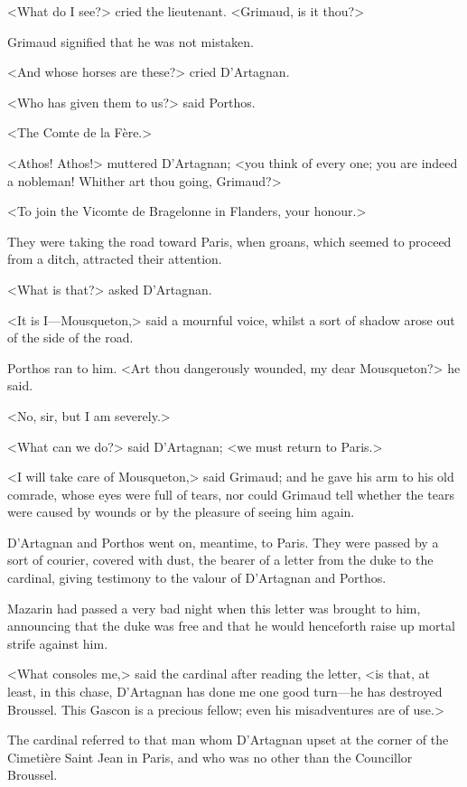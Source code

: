 <What do I see?> cried the lieutenant. <Grimaud, is it thou?>

Grimaud signified that he was not mistaken.

<And whose horses are these?> cried D'Artagnan.

<Who has given them to us?> said Porthos.

<The Comte de la Fère.>

<Athos! Athos!> muttered D'Artagnan; <you think of every one; you are indeed a nobleman! Whither art thou going, Grimaud?>

<To join the Vicomte de Bragelonne in Flanders, your honour.>

They were taking the road toward Paris, when groans, which seemed to proceed from a ditch, attracted their attention.

<What is that?> asked D'Artagnan.

<It is I—Mousqueton,> said a mournful voice, whilst a sort of shadow arose out of the side of the road.

Porthos ran to him. <Art thou dangerously wounded, my dear Mousqueton?> he said.

<No, sir, but I am severely.>

<What can we do?> said D'Artagnan; <we must return to Paris.>

<I will take care of Mousqueton,> said Grimaud; and he gave his arm to his old comrade, whose eyes were full of tears, nor could Grimaud tell whether the tears were caused by wounds or by the pleasure of seeing him again.

D'Artagnan and Porthos went on, meantime, to Paris. They were passed by a sort of courier, covered with dust, the bearer of a letter from the duke to the cardinal, giving testimony to the valour of D'Artagnan and Porthos.

Mazarin had passed a very bad night when this letter was brought to him, announcing that the duke was free and that he would henceforth raise up mortal strife against him.

<What consoles me,> said the cardinal after reading the letter, <is that, at least, in this chase, D'Artagnan has done me one good turn—he has destroyed Broussel. This Gascon is a precious fellow; even his misadventures are of use.>

The cardinal referred to that man whom D'Artagnan upset at the corner of the Cimetière Saint Jean in Paris, and who was no other than the Councillor Broussel. 